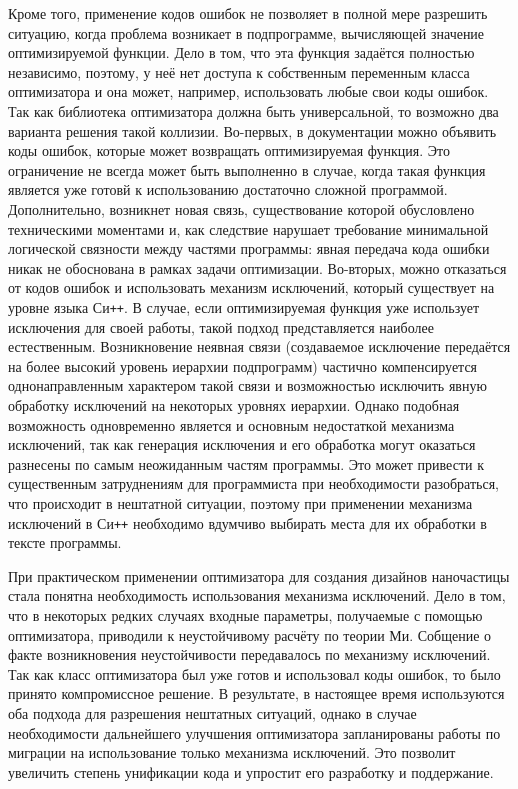 Кроме того, применение кодов ошибок не позволяет в полной мере
разрешить ситуацию, когда проблема возникает в подпрограмме,
вычисляющей значение оптимизируемой функции. Дело в том, что эта
функция задаётся полностью независимо, поэтому, у неё нет доступа к
собственным переменным класса оптимизатора и она может, например,
использовать любые свои коды ошибок. Так как библиотека оптимизатора
должна быть универсальной, то возможно два варианта решения такой
коллизии. Во-первых, в документации можно объявить коды ошибок,
которые может возвращать оптимизируемая функция. Это ограничение не
всегда может быть выполненно в случае, когда такая функция является
уже готовй к использованию достаточно сложной
программой. Дополнительно, возникнет новая связь, существование
которой обусловлено техническими моментами и, как следствие нарушает
требование минимальной логической связности между частями программы:
явная передача кода ошибки никак не обоснована в рамках задачи
оптимизации.  Во-вторых, можно отказаться от кодов ошибок и
использовать механизм исключений, который существует на уровне языка
Си\texttt{++}.  В случае, если оптимизируемая функция уже использует
исключения для своей работы, такой подход представляется наиболее
естественным.  Возникновение неявная связи (создаваемое исключение
передаётся на более высокий уровень иерархии подпрограмм) частично
компенсируется однонаправленным характером такой связи и возможностью
исключить явную обработку исключений на некоторых уровнях иерархии.
Однако подобная возможность одновременно является и основным
недостаткой механизма исключений, так как генерация исключения и его
обработка могут оказаться разнесены по самым неожиданным частям
программы.  Это может привести к существенным затруднениям для
программиста при необходимости разобраться, что происходит в нештатной
ситуации, поэтому при применении механизма исключений в Си\texttt{++}
необходимо вдумчиво выбирать места для их обработки в тексте
программы.

При практическом применении оптимизатора для создания дизайнов
наночастицы стала понятна необходимость использования механизма
исключений. Дело в том, что в некоторых редких случаях входные
параметры, получаемые с помощью оптимизатора, приводили к
неустойчивому расчёту по теории Ми. Собщение о факте возникновения
неустойчивости передавалось по механизму исключений. Так как класс
оптимизатора был уже готов и использовал коды ошибок, то было принято
компромиссное решение. В результате, в настоящее время используются
оба подхода для разрешения нештатных ситуаций, однако в случае
необходимости дальнейшего улучшения оптимизатора запланированы работы
по миграции на использование только механизма исключений. Это позволит
увеличить степень унификации кода и упростит его разработку и
поддержание. 

